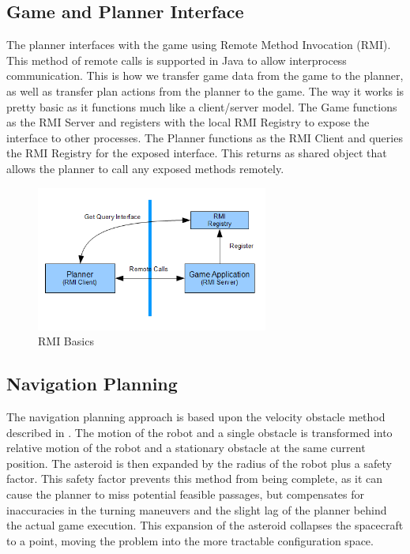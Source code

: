 \documentclass[10pt,draft,conference]{IEEEtran}
\begin{document}
\subsection{Game and Planner Interface}
The planner interfaces with the game using Remote Method Invocation (RMI).  This method of remote calls is supported in Java to allow interprocess communication.  This is how we transfer game data from the game to the planner, as well as transfer plan actions from the planner to the game.  The way it works is pretty basic as it functions much like a client/server model.  The Game functions as the RMI Server and registers with the local RMI Registry to expose the interface to other processes.  The Planner functions as the RMI Client and queries the RMI Registry for the exposed interface.  This returns as shared object that allows the planner to call any exposed methods remotely.

\begin{figure}
\centering
\includegraphics[width=3.0in]{RMI.png}
\caption{RMI Basics}
\label{fig_rmi}
\end{figure}

\subsection{Navigation Planning}

The navigation planning approach is based upon the velocity obstacle method described in \cite{fiorini1998motion}. The motion of the robot and a single obstacle is transformed into relative motion of the robot and a stationary obstacle at the same current position. The asteroid is then expanded by the radius of the robot plus a safety factor. This safety factor prevents this method from being complete, as it can cause the planner to miss potential feasible passages, but compensates for inaccuracies in the turning maneuvers and the slight lag of the planner behind the actual game execution. This expansion of the asteroid collapses the spacecraft to a point, moving the problem into the more tractable configuration space. 
\end{document}
